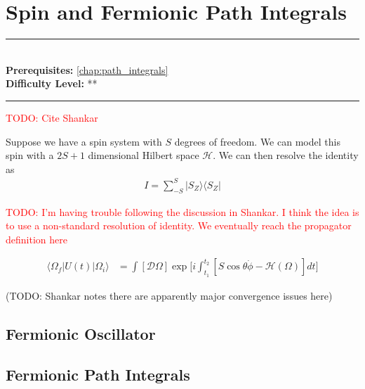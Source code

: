 \documentclass[book.tex]{subfiles}
\begin{document}
\chapter{Spin and Fermionic Path Integrals}

\label{chap:spin_fermionic}
\noindent\rule{11cm}{0.4pt} \\
\textbf{Prerequisites:}  \autoref{chap:path_integrals} \\
\textbf{Difficulty Level:} ** \\
\noindent\rule{11cm}{0.4pt}
\vspace{5mm}

\textcolor{red}{TODO: Cite Shankar}

Suppose we have a spin system with $S$ degrees of freedom. We can model this spin with a $2S+1$ dimensional Hilbert space $\mathcal{H}$. We can then resolve the identity as
\begin{align}
    I = \sum_{-S}^{S}|S_Z\rangle \langle S_Z |
\end{align}

\textcolor{red}{TODO: I'm having trouble following the discussion in Shankar. I think the idea is to use a non-standard resolution of identity. We eventually reach the propagator definition here}

\begin{align}
\langle \Omega_f | U(t) | \Omega_i \rangle &= \int [\mathcal{D}\Omega] \exp \Bigg[i\int_{t_1}^{t_2} [S\cos \theta \dot{\phi} - \mathcal{H}(\Omega)] dt\Bigg]
\end{align}

(TODO: Shankar notes there are apparently major convergence issues here)

\section{Fermionic Oscillator}



\section{Fermionic Path Integrals}
\end{document}
